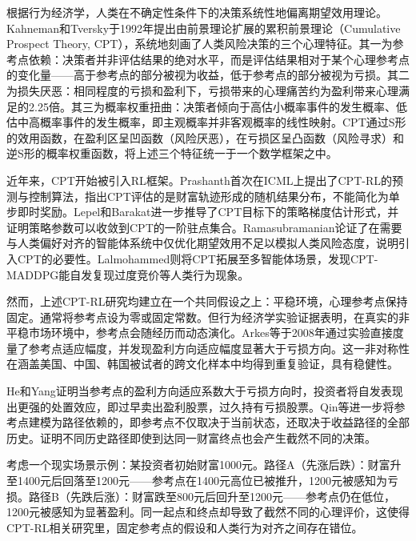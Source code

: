 \documentclass{sufethesismas}
\begin{document}
根据行为经济学，人类在不确定性条件下的决策系统性地偏离期望效用理论。Kahneman和Tversky于1992年提出由前景理论扩展的累积前景理论（Cumulative Prospect Theory, CPT），系统地刻画了人类风险决策的三个心理特征\citep{kahneman1979prospect,tversky1992advances}。其一为参考点依赖：决策者并非评估结果的绝对水平，而是评估结果相对于某个心理参考点的变化量——高于参考点的部分被视为收益，低于参考点的部分被视为亏损。其二为损失厌恶：相同程度的亏损和盈利下，亏损带来的心理痛苦约为盈利带来心理满足的2.25倍。其三为概率权重扭曲：决策者倾向于高估小概率事件的发生概率、低估中高概率事件的发生概率，即主观概率并非客观概率的线性映射。CPT通过S形的效用函数，在盈利区呈凹函数（风险厌恶），在亏损区呈凸函数（风险寻求）和逆S形的概率权重函数，将上述三个特征统一于一个数学框架之中。

近年来，CPT开始被引入RL框架。Prashanth首次在ICML上提出了CPT-RL的预测与控制算法，指出CPT评估的是财富轨迹形成的随机结果分布，不能简化为单步即时奖励\citep{prashanth2016cumulative}。Lepel和Barakat进一步推导了CPT目标下的策略梯度估计形式，并证明策略参数可以收敛到CPT的一阶驻点集合\citep{lepel2026policygradients}。Ramasubramanian论证了在需要与人类偏好对齐的智能体系统中仅优化期望效用不足以模拟人类风险态度，说明引入CPT的必要性\citep{ramasubramanian2021reinforcement}。Lalmohammed则将CPT拓展至多智能体场景，发现CPT-MADDPG能自发复现过度竞价等人类行为现象\citep{lalmohammed2025modeling}。

然而，上述CPT-RL研究均建立在一个共同假设之上：平稳环境，心理参考点保持固定。通常将参考点设为零或固定常数。但行为经济学实验证据表明，在真实的非平稳市场环境中，参考点会随经历而动态演化。Arkes等于2008年通过实验直接度量了参考点适应幅度，并发现盈利方向适应幅度显著大于亏损方向\citep{arkes2008reference}。这一非对称性在涵盖美国、中国、韩国被试者的跨文化样本中均得到重复验证，具有稳健性\citep{ARKES201099}。

He和Yang证明当参考点的盈利方向适应系数大于亏损方向时，投资者将自发表现出更强的处置效应，即过早卖出盈利股票，过久持有亏损股票\citep{he2019realization}。Qin等进一步将参考点建模为路径依赖的，即参考点不仅取决于当前状态，还取决于收益路径的全部历史。证明不同历史路径即使到达同一财富终点也会产生截然不同的决策\citep{qin2022realization}。

考虑一个现实场景示例：某投资者初始财富1000元。路径A（先涨后跌）：财富升至1400元后回落至1200元——参考点在1400元高位已被推升，1200元被感知为亏损。路径B（先跌后涨）：财富跌至800元后回升至1200元——参考点仍在低位，1200元被感知为显著盈利。同一起点和终点却导致了截然不同的心理评价，这使得CPT-RL相关研究里，固定参考点的假设和人类行为对齐之间存在错位。
\end{document}
